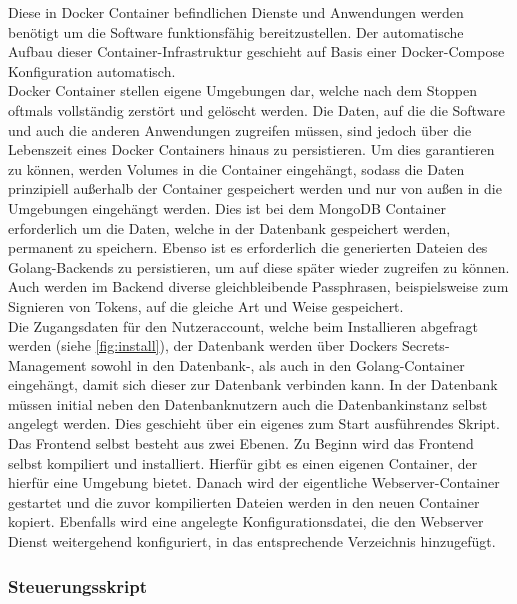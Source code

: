 \newpage

Diese in Docker Container befindlichen Dienste und Anwendungen werden benötigt um die Software funktionsfähig bereitzustellen. Der automatische Aufbau dieser Container-Infrastruktur geschieht auf Basis einer Docker-Compose Konfiguration automatisch. \\

Docker Container stellen eigene Umgebungen dar, welche nach dem Stoppen oftmals vollständig zerstört und gelöscht werden. Die Daten, auf die die Software und auch die anderen Anwendungen zugreifen müssen, sind jedoch über die Lebenszeit eines Docker Containers hinaus zu persistieren. Um dies garantieren zu können, werden Volumes in die Container eingehängt, sodass die Daten prinzipiell außerhalb der Container gespeichert werden und nur von außen in die Umgebungen eingehängt werden. Dies ist bei dem MongoDB Container erforderlich um die Daten, welche in der Datenbank gespeichert werden, permanent zu speichern. Ebenso ist es erforderlich die generierten Dateien des Golang-Backends zu persistieren, um auf diese später wieder zugreifen zu können. Auch werden im Backend diverse gleichbleibende Passphrasen, beispielsweise zum Signieren von Tokens, auf die gleiche Art und Weise gespeichert. \\

Die Zugangsdaten für den Nutzeraccount, welche beim Installieren abgefragt werden (siehe \autoref{fig:install}), der Datenbank werden über Dockers Secrets-Management sowohl in den Datenbank-, als auch in den Golang-Container eingehängt, damit sich dieser zur Datenbank verbinden kann. In der Datenbank müssen initial neben den Datenbanknutzern auch die Datenbankinstanz selbst angelegt werden. Dies geschieht über ein eigenes zum Start ausführendes Skript. \\

Das Frontend selbst besteht aus zwei Ebenen. Zu Beginn wird das Frontend selbst kompiliert und installiert. Hierfür gibt es einen eigenen Container, der hierfür eine Umgebung bietet. Danach wird der eigentliche Webserver-Container gestartet und die zuvor kompilierten Dateien werden in den neuen Container kopiert. Ebenfalls wird eine angelegte Konfigurationsdatei, die den Webserver Dienst weitergehend konfiguriert, in das entsprechende Verzeichnis hinzugefügt.\\


\newpage

\subsubsection{Steuerungsskript}

